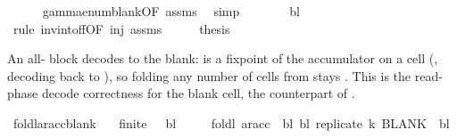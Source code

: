 \begin{isabellebody}
\ \ \ \ \isamarkupfalse%
\ gamma{\isacharunderscore}{\kern0pt}enum{\isacharunderscore}{\kern0pt}blank{\isacharbrackleft}{\kern0pt}OF\ assms{\isacharparenleft}{\kern0pt}{}{\isacharparenright}{\kern0pt}{\isacharbrackright}{\kern0pt}\ \isamarkupfalse%
\ simp\isanewline
\ \ \isamarkupfalse%
\ \isamarkupfalse%
\ {\isachardoublequoteopen}{\isasymdots}\ {\isacharequal}{\kern0pt}\ bl{\isachardoublequoteclose}\ \isamarkupfalse%
\ {\isacharparenleft}{\kern0pt}rule\ inv{\isacharunderscore}{\kern0pt}into{\isacharunderscore}{\kern0pt}f{\isacharunderscore}{\kern0pt}f{\isacharbrackleft}{\kern0pt}OF\ inj\ assms{\isacharparenleft}{\kern0pt}{}{\isacharparenright}{\kern0pt}{\isacharbrackright}{\kern0pt}{\isacharparenright}{\kern0pt}\isanewline
\ \ \isamarkupfalse%
\ \isamarkupfalse%
\ {\isacharquery}{\kern0pt}thesis\ \isakeywordONE{{\isachardot}{\kern0pt}}\isamarkupfalse%
\isanewline
{}\isamarkupfalse%
%
\endisatagproof
{\isafoldproof}%
%
\isadelimproof
%
\endisadelimproof
%
\begin{isamarkuptext}%
An all- block decodes to the blank:  is a
  fixpoint of the accumulator on a  cell (, decoding back to ), so folding
  any number of  cells from  stays .
  This is the read-phase decode correctness for the blank cell, the
   counterpart of .%
\end{isamarkuptext}\isamarkuptrue%
\isamarkupfalse%
\ foldl{\isacharunderscore}{\kern0pt}ar{\isacharunderscore}{\kern0pt}acc{\isacharunderscore}{\kern0pt}blank{\isacharcolon}{\kern0pt}\isanewline
\ \ \ {\isachardoublequoteopen}finite\ {\isasymGamma}{\isachardoublequoteclose}\ \ {\isachardoublequoteopen}bl\ {\isasymin}\ {\isasymGamma}{\isachardoublequoteclose}\isanewline
\ \ \ {\isachardoublequoteopen}foldl\ {\isacharparenleft}{\kern0pt}ar{\isacharunderscore}{\kern0pt}acc\ {\isasymGamma}\ bl{\isacharparenright}{\kern0pt}\ bl\ {\isacharparenleft}{\kern0pt}replicate\ k\ BLANK{}{\isacharparenright}{\kern0pt}\ {\isacharequal}{\kern0pt}\ bl{\isachardoublequoteclose}\isanewline

\end{isabellebody}
